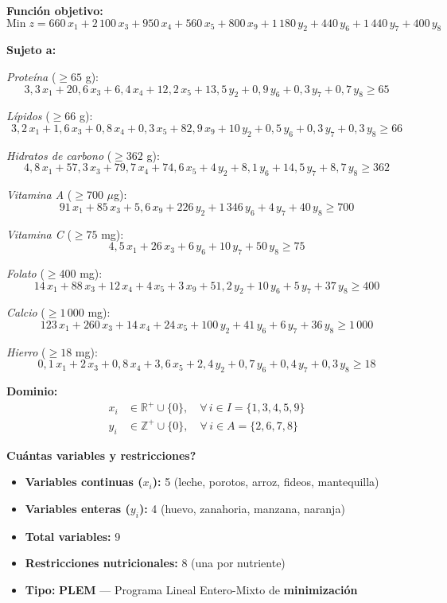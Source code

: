 \documentclass[12pt]{article}
\begin{document}
\begin{mdframed}[backgroundcolor=gray!5, linewidth=1.5pt]

\textbf{Funci\'on objetivo:}
\[
    \text{Min}\; z = 660\,x_1 + 2\,100\,x_3 + 950\,x_4 + 560\,x_5 + 800\,x_9
    + 1\,180\,y_2 + 440\,y_6 + 1\,440\,y_7 + 400\,y_8
\]

\textbf{Sujeto a:}

\medskip
\textit{Prote\'ina} ($\geq 65$ g):
\[
    3{,}3\,x_1 + 20{,}6\,x_3 + 6{,}4\,x_4 + 12{,}2\,x_5
    + 13{,}5\,y_2 + 0{,}9\,y_6 + 0{,}3\,y_7 + 0{,}7\,y_8 \geq 65
\]

\textit{L\'ipidos} ($\geq 66$ g):
\[
    3{,}2\,x_1 + 1{,}6\,x_3 + 0{,}8\,x_4 + 0{,}3\,x_5 + 82{,}9\,x_9
    + 10\,y_2 + 0{,}5\,y_6 + 0{,}3\,y_7 + 0{,}3\,y_8 \geq 66
\]

\textit{Hidratos de carbono} ($\geq 362$ g):
\[
    4{,}8\,x_1 + 57{,}3\,x_3 + 79{,}7\,x_4 + 74{,}6\,x_5
    + 4\,y_2 + 8{,}1\,y_6 + 14{,}5\,y_7 + 8{,}7\,y_8 \geq 362
\]

\textit{Vitamina A} ($\geq 700$ $\mu$g):
\[
    91\,x_1 + 85\,x_3 + 5{,}6\,x_9
    + 226\,y_2 + 1\,346\,y_6 + 4\,y_7 + 40\,y_8 \geq 700
\]

\textit{Vitamina C} ($\geq 75$ mg):
\[
    4{,}5\,x_1 + 26\,x_3
    + 6\,y_6 + 10\,y_7 + 50\,y_8 \geq 75
\]

\textit{Folato} ($\geq 400$ mg):
\[
    14\,x_1 + 88\,x_3 + 12\,x_4 + 4\,x_5 + 3\,x_9
    + 51{,}2\,y_2 + 10\,y_6 + 5\,y_7 + 37\,y_8 \geq 400
\]

\textit{Calcio} ($\geq 1\,000$ mg):
\[
    123\,x_1 + 260\,x_3 + 14\,x_4 + 24\,x_5
    + 100\,y_2 + 41\,y_6 + 6\,y_7 + 36\,y_8 \geq 1\,000
\]

\textit{Hierro} ($\geq 18$ mg):
\[
    0{,}1\,x_1 + 2\,x_3 + 0{,}8\,x_4 + 3{,}6\,x_5
    + 2{,}4\,y_2 + 0{,}7\,y_6 + 0{,}4\,y_7 + 0{,}3\,y_8 \geq 18
\]

\medskip
\textbf{Dominio:}
\begin{align*}
    x_i &\in \mathbb{R}^+ \cup \{0\}, \quad \forall\, i \in I = \{1, 3, 4, 5, 9\} \\
    y_i &\in \mathbb{Z}^+ \cup \{0\}, \quad \forall\, i \in A = \{2, 6, 7, 8\}
\end{align*}
\end{mdframed}

\begin{cajanota}
\textbf{\textquestiondown Cu\'antas variables y restricciones?}
\begin{itemize}
    \item \textbf{Variables continuas ($x_i$):} 5 (leche, porotos, arroz, fideos, mantequilla)
    \item \textbf{Variables enteras ($y_i$):} 4 (huevo, zanahoria, manzana, naranja)
    \item \textbf{Total variables:} 9
    \item \textbf{Restricciones nutricionales:} 8 (una por nutriente)
    \item \textbf{Tipo:} \textbf{PLEM} --- Programa Lineal Entero-Mixto de \textbf{minimizaci\'on}
\end{itemize}
\end{cajanota}
\end{document}
